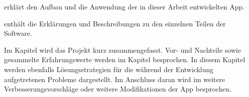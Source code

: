 \textbf{} erklärt den Aufbau und die Anwendung der in dieser Arbeit entwickelten App.

\textbf{} enthält die Erklärungen und Beschreibungen zu den einzelnen Teilen der Software.

Im Kapitel \textbf{} wird das Projekt kurz zusammengefasst. Vor- und Nachteile sowie gesammelte Erfahrungswerte werden im Kapitel \textbf{} besprochen. In diesem Kapitel werden ebenfalls Lösungsstrategien für die während der Entwicklung aufgetretenen Probleme dargestellt. Im Anschluss daran wird im \textbf{} weitere Verbesserungsvorschläge oder weitere Modifikationen der App besprochen.
